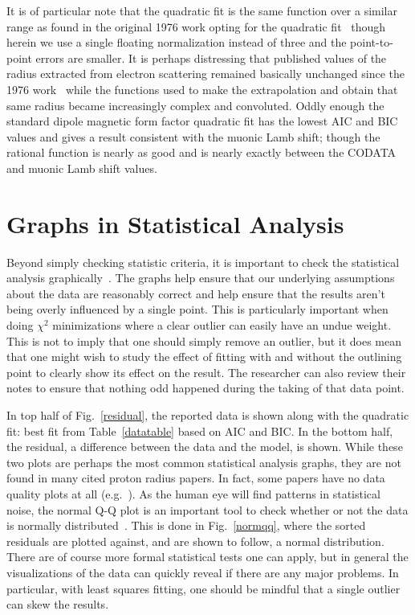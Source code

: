 \documentclass[10pt,superscriptaddress,aps,prc,twocolumn]{revtex4-1}
\begin{document}
It is of particular note that the quadratic fit is the same function over a similar 
range as found in the original 1976 work opting for
the quadratic fit~\cite{Borkowski:1975ume} though herein we 
use a single floating normalization instead of three and the point-to-point errors are smaller.   
It is perhaps distressing that published values of the 
radius extracted from electron scattering remained basically unchanged since the 1976 work~\cite{Borkowski:1975ume} while the 
functions used to make the extrapolation and obtain that same radius became increasingly complex and convoluted.
Oddly enough the standard dipole magnetic form factor quadratic fit has the lowest AIC and BIC values and gives a result consistent
with the muonic Lamb shift; though the rational function is nearly as good and is nearly exactly between the CODATA
and muonic Lamb shift values.    


\section{Graphs in Statistical Analysis}

Beyond simply checking statistic criteria, it is important to check the statistical analysis graphically~\cite{Anscombe:1973}.
The graphs help ensure that our underlying assumptions about the data are reasonably correct and help ensure that the results
aren't being overly influenced by a single point.   This is particularly important when doing $\chi^2$ minimizations where a
clear outlier can easily have an undue weight.    This is not to imply that one should simply remove an outlier, but it does
mean that one might wish to study the effect of fitting with and without the outlining point to clearly show its effect on 
the result.   The researcher can also review their notes to ensure that nothing odd happened during the taking of that data
point.

In top half of Fig.~\ref{residual}, the reported data is shown along with the quadratic fit:  best fit from Table~\ref{datatable} based
on AIC and BIC.   In the bottom half, the residual, a difference between the data and the model, is shown.     While these two plots
are perhaps the most common statistical analysis graphs, they are not found in many cited proton radius papers.  In fact, some
papers have no data quality plots at all (e.g.~\cite{Rosenfelder:1999cd}).
As the human eye will find patterns in statistical noise, the normal Q-Q plot is an important tool to check whether or not the 
data is normally distributed~\cite{Wilk:1968}.   This is done in Fig.~\ref{normqq}, where the sorted residuals are plotted against,
and are shown to follow, a normal distribution.   There are of course more formal statistical tests one can apply, but in general the
visualizations of the data can quickly reveal if there are any major problems.   In particular, with least squares fitting, one should
be mindful that a single outlier can skew the results.
\end{document}
